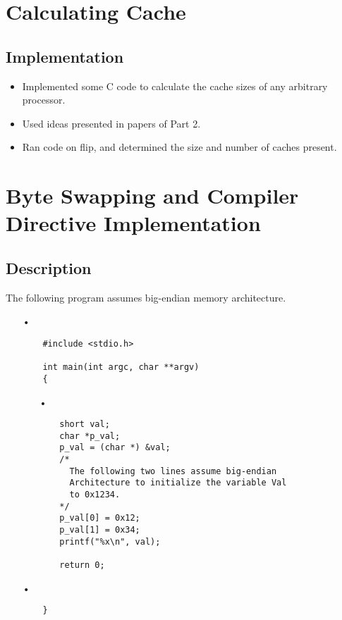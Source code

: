 \documentclass[letterpaper,10pt,onecolumn,compsoc]{IEEEtran}
\begin{document}


\section{Calculating Cache}

\subsection{Implementation}

\begin{itemize}
	\item Implemented some C code to calculate the cache sizes of any arbitrary processor.
	\item Used ideas presented in papers of Part 2.
	\item Ran code on flip, and determined the size and number of caches present.
\end{itemize}

\section{Byte Swapping and Compiler Directive Implementation}

\subsection{Description}

\noindent
The following program assumes big-endian memory architecture.


\begin{itemize}
	\item[•]
	\begin{verbatim}
	#include <stdio.h>

	int main(int argc, char **argv)
	{
	\end{verbatim}
	\begin{itemize}
	\item[•]
	\begin{verbatim}
	short val;
	char *p_val;
	p_val = (char *) &val;
	/*
	  The following two lines assume big-endian
	  Architecture to initialize the variable Val
	  to 0x1234.
	*/
	p_val[0] = 0x12;
	p_val[1] = 0x34;
	printf("%x\n", val);
	
	return 0;
	\end{verbatim}
	\end{itemize}
	\item[•]
	\begin{verbatim}
	}
	\end{verbatim}
\end{itemize}
\end{document}

